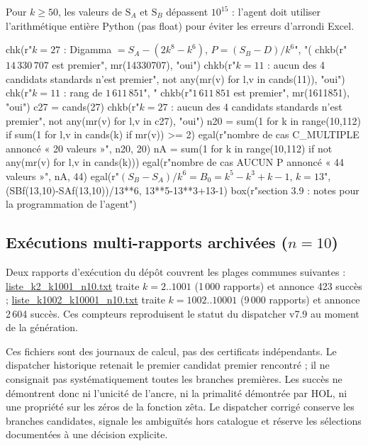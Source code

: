 \documentclass[11pt,a4paper]{article}
\newcommand{\SA}{\mathrm{S}_A}
\newcommand{\SB}{\mathrm{S}_B}
\begin{document}
\vspace{0.6cm}

\vspace{0.3cm}
\begin{boitealerte}
Pour $k \ge 50$, les valeurs de $\SA$ et $\SB$ dépassent $10^{15}$ : l'agent
doit utiliser l'arithmétique entière Python (pas float) pour éviter les erreurs
d'arrondi Excel.
\end{boitealerte}
\vspace{0.6cm}

\begin{pycode}
chk(r"$k=27$ : Digamma $=S_A-(2k^{8}-k^{6})$, $P=(S_B-D)/k^6$", "(%
chkb(r"$14\,330\,707$ est premier", mr(14330707), "oui")
chkb(r"$k=11$ : aucun des 4 candidats standards n'est premier", not any(mr(v) for l,v in cands(11)), "oui")
chk(r"$k=11$ : rang de $1\,611\,851$", "%
chkb(r"$1\,611\,851$ est premier", mr(1611851), "oui")
c27 = cands(27)
chkb(r"$k=27$ : aucun des 4 candidats standards n'est premier", not any(mr(v) for l,v in c27), "oui")
n20 = sum(1 for k in range(10,112) if sum(1 for l,v in cands(k) if mr(v)) >= 2)
egal(r"nombre de cas C\_MULTIPLE annoncé « 20 valeurs »", n20, 20)
nA = sum(1 for k in range(10,112) if not any(mr(v) for l,v in cands(k)))
egal(r"nombre de cas AUCUN P annoncé « 44 valeurs »", nA, 44)
egal(r"$(S_B-S_A)/k^6=B_0=k^5-k^3+k-1$, $k=13$", (SBf(13,10)-SAf(13,10))/13**6, 13**5-13**3+13-1)
box(r"section 3.9 : notes pour la programmation de l'agent")
\end{pycode}

\subsection{Exécutions multi-rapports archivées (\texorpdfstring{$n=10$}{n=10})}
Deux rapports d'exécution du dépôt couvrent les plages communes suivantes :
\url{liste_k2_k1001_n10.txt} traite $k=2..1001$ (1\,000 rapports) et
annonce 423 succès ; \url{liste_k1002_k10001_n10.txt} traite
$k=1002..10001$ (9\,000 rapports) et annonce 2\,604 succès. Ces compteurs
reproduisent le statut du dispatcher v7.9 au moment de la génération.

\vspace{0.3cm}
\begin{boitealerte}
Ces fichiers sont des journaux de calcul, pas des certificats indépendants.
Le dispatcher historique retenait le premier candidat premier rencontré ; il
ne consignait pas systématiquement toutes les branches premières. Les succès
ne démontrent donc ni l'unicité de l'ancre, ni la primalité démontrée par HOL,
ni une propriété sur les zéros de la fonction zêta. Le dispatcher corrigé
conserve les branches candidates, signale les ambiguïtés hors catalogue et
réserve les sélections documentées à une décision explicite.
\end{boitealerte}
\end{document}
